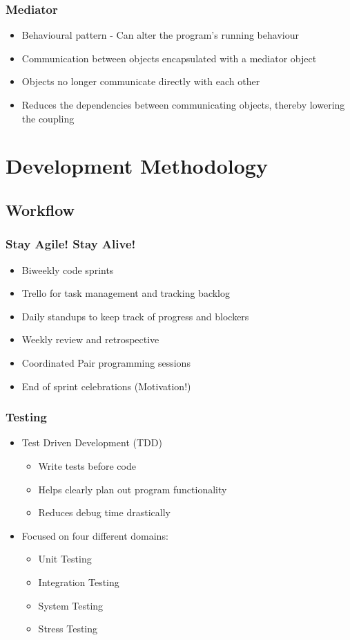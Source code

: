 \documentclass{beamer}
\begin{document}
\begin{frame}
\frametitle{Mediator}
\begin{itemize}
\item Behavioural pattern - Can alter the program's running behaviour
\item Communication between objects encapsulated with a mediator object
\item Objects no longer communicate directly with each other
\item Reduces the dependencies between communicating objects, thereby lowering the coupling
\end{itemize}
\end{frame}
\section{Development Methodology}
\subsection{Workflow}
\begin{frame}
\frametitle{Stay Agile! Stay Alive!}
\begin{itemize}
\item Biweekly code sprints
\item Trello for task management and tracking backlog
\item Daily standups to keep track of progress and blockers
\item Weekly review and retrospective
\item Coordinated Pair programming sessions
\item End of sprint celebrations (Motivation!)
\end{itemize}
\end{frame}

\begin{frame}
\frametitle{Testing}
\begin{itemize}
\item Test Driven Development (TDD)
\begin{itemize}
\item Write tests before code
\item Helps clearly plan out program functionality
\item Reduces debug time drastically
\end{itemize}
\item Focused on four different domains:
\begin{itemize}
\item Unit Testing
\item Integration Testing 
\item System Testing
\item Stress Testing 
\end{itemize}
\end{itemize}
\end{frame}
\end{document}
